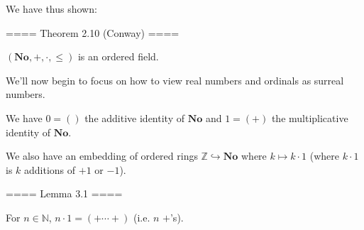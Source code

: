 We have thus shown:

==== Theorem 2.10 (Conway) ====

$(\mathbf{No}, +, \cdot, \leq)$ is an ordered field.

We'll now begin to focus on how to view real numbers and ordinals as surreal numbers.

We have $0 = ()$ the additive identity of $\mathbf{No}$ and $1 = (+)$ the multiplicative identity of $\mathbf{No}$.

We also have an embedding of ordered rings $\mathbb{Z} \hookrightarrow \mathbf{No}$ where $k\mapsto k\cdot 1$ (where $k\cdot 1$ is $k$ additions of $+1$ or $-1$).

==== Lemma 3.1 ====

For $n\in \mathbb{N}$, $n\cdot 1 = (+\cdots +)$ (i.e. $n$ $+$'s).
